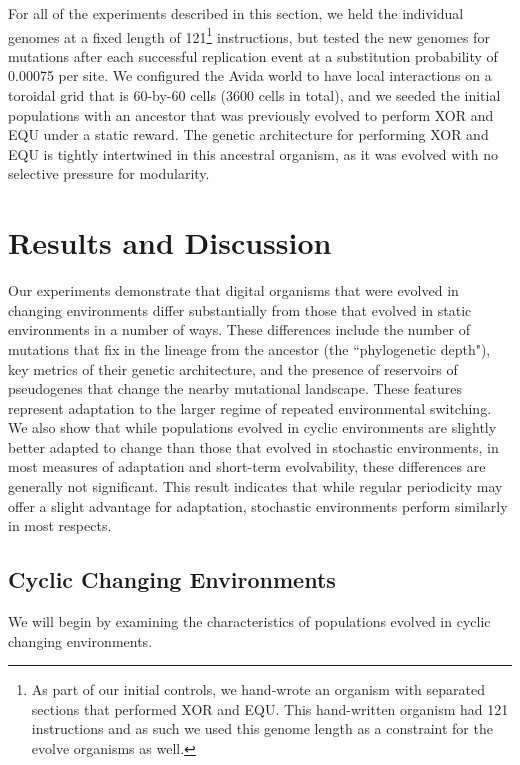 \documentclass[PhD]{msu-thesis}
\begin{document}
For all of the experiments described in this section, we held the individual genomes at a fixed length of 121\footnote{As part of our initial controls, we hand-wrote an organism with separated sections that performed XOR and EQU. This hand-written organism had 121 instructions and as such we used this genome length as a constraint for the evolve organisms as well.} instructions, but tested the new genomes for mutations after each successful replication event at a substitution probability of 0.00075 per site. We configured the Avida world to have local interactions on a toroidal grid that is 60-by-60 cells (3600 cells in total), and we seeded the initial populations with an ancestor that was previously evolved to perform XOR and EQU under a static reward. The genetic architecture for performing XOR and EQU is tightly intertwined in this ancestral organism, as it was evolved with no selective pressure for modularity.


\section{Results and Discussion}
Our experiments demonstrate that digital organisms that were evolved in changing environments differ substantially from those that evolved in static environments in a number of ways. These differences include the number of mutations that fix in the lineage from the ancestor (the ``phylogenetic depth"), key metrics of their genetic architecture, and the presence of reservoirs of pseudogenes that change the nearby mutational landscape. These features represent adaptation to the larger regime of repeated environmental switching. We also show that while populations evolved in cyclic environments are slightly better adapted to change than those that evolved in stochastic environments, in most measures of adaptation and short-term evolvability, these differences are generally not significant. This result indicates that while regular periodicity may offer a slight advantage for adaptation, stochastic environments perform similarly in most respects. 

\subsection{Cyclic Changing Environments}
We will begin by examining the characteristics of populations evolved in cyclic changing environments.
\end{document}
